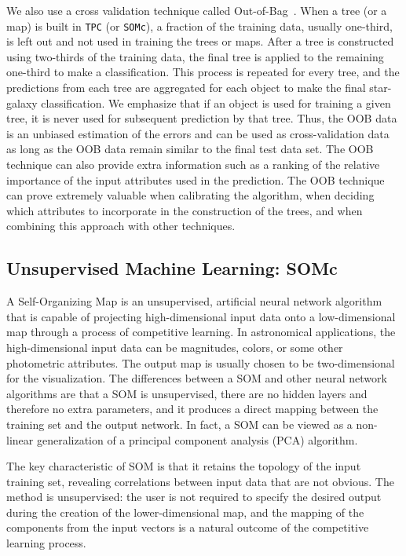 \documentclass[useAMS,usenatbib]{mn2e}
\begin{document}
We also use a cross validation technique called
Out-of-Bag~\citep[OOB;][]{breiman1984classification, carrascokind2013tpz}.
When a tree (or a map) is built in \texttt{TPC} (or \texttt{SOMc}),
a fraction of the training data, usually one-third,
is left out and not used in training the trees or maps.
After a tree is constructed using two-thirds of the training data,
the final tree is applied to the remaining one-third
to make a classification.
This process is repeated for every tree,
and the predictions from each tree are aggregated
for each object to make the final star-galaxy classification.
We emphasize that if an object is used for training a given tree,
it is never used for subsequent prediction by that tree.
Thus, the OOB data is an unbiased estimation of the errors
and can be used as cross-validation data
as long as the OOB data remain similar to the final test data set.
The OOB technique can also provide extra information such as
a ranking of the relative importance of the input attributes
used in the prediction.
The OOB technique can prove extremely valuable
when calibrating the algorithm,
when deciding which attributes to incorporate in the construction of the trees,
and when combining this approach with other techniques.


\subsection{Unsupervised Machine Learning: SOMc}

A Self-Organizing Map
\citep[SOM;][]{kohonen1990self, kohonen2001self}
is an unsupervised, artificial neural network algorithm
that is capable of projecting high-dimensional input data
onto a low-dimensional map
through a process of competitive learning.
In astronomical applications,
the high-dimensional input data can be
magnitudes, colors, or some other photometric attributes.
The output map is usually chosen to be two-dimensional
for the visualization.
The differences between a SOM and other neural network algorithms are
that a SOM is unsupervised,
there are no hidden layers and therefore no extra parameters,
and it produces a direct mapping
between the training set and the output network.
In fact, a SOM can be viewed as a non-linear generalization
of a principal component analysis (PCA) algorithm.

The key characteristic of SOM is that
it retains the topology of the input training set,
revealing correlations between input data that are not obvious.
The method is unsupervised:
the user is not required to specify the desired output
during the creation of the lower-dimensional map,
and the mapping of the components from the input vectors
is a natural outcome of the competitive learning process.
\end{document}
